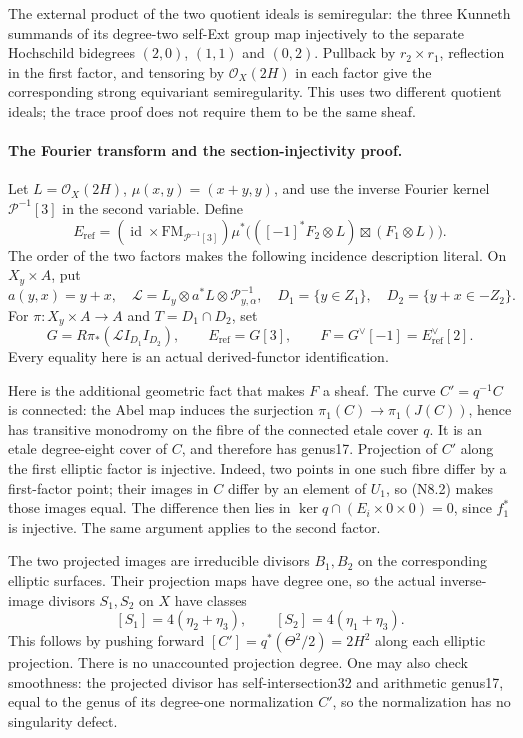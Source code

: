 The external product of the two quotient ideals is semiregular:
the three Kunneth summands of its degree-two self-Ext group map
injectively to the separate Hochschild bidegrees $(2,0)$, $(1,1)$
and $(0,2)$. Pullback by $r_2\times r_1$, reflection in the first
factor, and tensoring by $\mathcal O_X(2H)$ in each factor give
the corresponding strong equivariant semiregularity. This uses
two different quotient ideals; the trace proof does not require
them to be the same sheaf.

\paragraph{The Fourier transform and the section-injectivity proof.}
Let $L=\mathcal O_X(2H)$, $\mu(x,y)=(x+y,y)$, and use the inverse
Fourier kernel $\mathcal P^{-1}[3]$ in the second variable. Define
\[
 E_{\mathrm{ref}}=
 (\operatorname{id}\times\mathrm{FM}_{\mathcal P^{-1}[3]})
 \mu^*\bigl(([-1]^*F_2\otimes L)\boxtimes(F_1\otimes L)\bigr).
                                                               \tag{N8.4}
\]
The order of the two factors makes the following incidence
description literal. On $X_y\times A$, put
\[
 a(y,x)=y+x,\quad
 \mathcal L=L_y\otimes a^*L\otimes\mathcal P_{y,\alpha}^{-1},
 \quad D_1=\{y\in Z_1\},\quad D_2=\{y+x\in-Z_2\}.
\]
For $\pi:X_y\times A\to A$ and $T=D_1\cap D_2$, set
\[
 G=R\pi_*(\mathcal L I_{D_1}I_{D_2}),
 \qquad E_{\mathrm{ref}}=G[3],\qquad F=G^\vee[-1]
               =E_{\mathrm{ref}}^\vee[2].                 \tag{N8.5}
\]
Every equality here is an actual derived-functor identification.

Here is the additional geometric fact that makes $F$ a sheaf.
The curve $C'=q^{-1}C$ is connected: the Abel map induces the
surjection $\pi_1(C)\to\pi_1(J(C))$, hence has transitive monodromy
on the fibre of the connected etale cover $q$. It is an etale
degree-eight cover of $C$, and therefore has genus17. Projection
of $C'$ along the first elliptic factor is injective. Indeed, two
points in one such fibre differ by a first-factor point; their
images in $C$ differ by an element of $U_1$, so (N8.2) makes those
images equal. The difference then lies in
$\ker q\cap(E_i\times0\times0)=0$, since $f_1^*$ is injective.
The same argument applies to the second factor.

The two projected images are irreducible divisors $B_1,B_2$ on
the corresponding elliptic surfaces. Their projection maps have
degree one, so the actual inverse-image divisors $S_1,S_2$ on $X$
have classes
\[
 [S_1]=4(\eta_2+\eta_3),\qquad
 [S_2]=4(\eta_1+\eta_3).                                  \tag{N8.6}
\]
This follows by pushing forward
$[C']=q^*(\Theta^2/2)=2H^2$ along each elliptic projection.
There is no unaccounted projection degree. One may also check
smoothness: the projected divisor has self-intersection32 and
arithmetic genus17, equal to the genus of its degree-one
normalization $C'$, so the normalization has no singularity defect.

